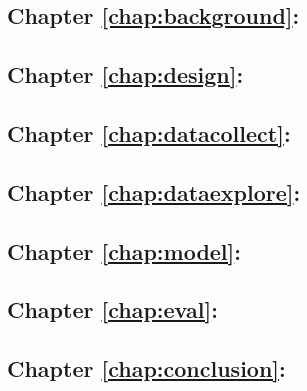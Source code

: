 \subsection* {Chapter \ref{chap:background}: }
\subsection* {Chapter \ref{chap:design}: }
\subsection* {Chapter \ref{chap:datacollect}: }
\subsection* {Chapter \ref{chap:dataexplore}: }
\subsection* {Chapter \ref{chap:model}: }
\subsection* {Chapter \ref{chap:eval}: }
\subsection* {Chapter \ref{chap:conclusion}: }